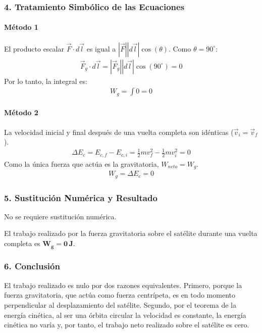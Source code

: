 \subsubsection*{4. Tratamiento Simbólico de las Ecuaciones}
\paragraph*{Método 1}
El producto escalar $\vec{F} \cdot d\vec{l}$ es igual a $|\vec{F}| |d\vec{l}| \cos(\theta)$. Como $\theta = 90^\circ$:
\begin{gather}
    \vec{F}_g \cdot d\vec{l} = |\vec{F}_g| |d\vec{l}| \cos(90^\circ) = 0
\end{gather}
Por lo tanto, la integral es:
\begin{gather}
    W_g = \int 0 = 0
\end{gather}
\paragraph*{Método 2}
La velocidad inicial y final después de una vuelta completa son idénticas ($\vec{v}_i = \vec{v}_f$).
\begin{gather}
    \Delta E_c = E_{c,f} - E_{c,i} = \frac{1}{2}mv_f^2 - \frac{1}{2}mv_i^2 = 0
\end{gather}
Como la única fuerza que actúa es la gravitatoria, $W_{neto} = W_g$.
\begin{gather}
    W_g = \Delta E_c = 0
\end{gather}

\subsubsection*{5. Sustitución Numérica y Resultado}
No se requiere sustitución numérica.
\begin{cajaresultado}
    El trabajo realizado por la fuerza gravitatoria sobre el satélite durante una vuelta completa es $\boldsymbol{W_g = 0 \, J}$.
\end{cajaresultado}

\subsubsection*{6. Conclusión}
\begin{cajaconclusion}
    El trabajo realizado es nulo por dos razones equivalentes. Primero, porque la fuerza gravitatoria, que actúa como fuerza centrípeta, es en todo momento perpendicular al desplazamiento del satélite. Segundo, por el teorema de la energía cinética, al ser una órbita circular la velocidad es constante, la energía cinética no varía y, por tanto, el trabajo neto realizado sobre el satélite es cero.
\end{cajaconclusion}

